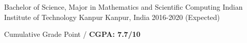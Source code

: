 \begin{cventries}
  \cventry
    {Bachelor of Science, Major in Mathematics and Scientific Computing }
    {Indian Institute of Technology Kanpur}
    {Kanpur, India}
    {2016-2020 (Expected)}
    {
      \begin{cvitems}
        \item {Cumulative Grade Point / \textbf{CGPA: 7.7/10}}
      \end{cvitems}
    }
    
    
\end{cventries}
